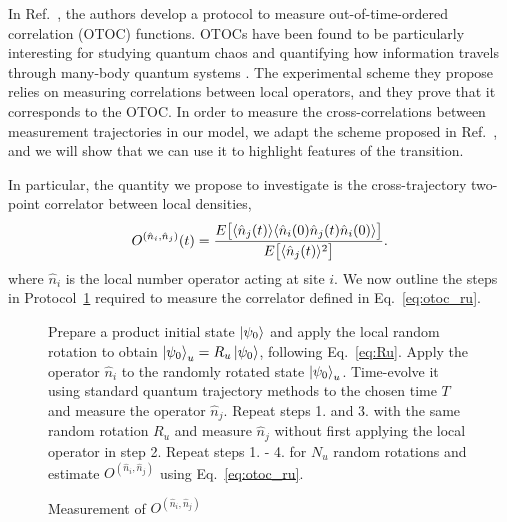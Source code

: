  In Ref.~\cite{vermersch2019}, the authors develop a protocol to measure out-of-time-ordered correlation (OTOC) functions. OTOCs have been found to be particularly interesting for studying quantum chaos \cite{cotler2018} and quantifying how information travels through many-body quantum systems \cite{hosur2016, chen2016,fan2017,nahum2018a, vonkeyserlingk2018a}. The experimental scheme they propose relies on measuring correlations between local operators, and they prove that it corresponds to the OTOC. In order to measure the cross-correlations between measurement trajectories in our model, we adapt the scheme proposed in Ref.~\cite{vermersch2019}, and we will show that we can use it to highlight features of the transition. 
 
 In particular, the quantity we propose to investigate is the cross-trajectory two-point correlator between local densities,
\begin{equation}
\label{eq:otoc_ru}
    O^{(\hat{n}_i,\hat{n}_j)}(t)= \frac{ E\big[\langle\hat{n}_j(t)\rangle \langle\hat{n}_i(0) \hat{n}_j(t) \hat{n}_i(0)\rangle \big] }{ E\big[\langle\hat{n}_j(t)\rangle^2\big]}.
\end{equation}
where $\hat{n}_i$ is the local number operator acting at site $i$. We now outline the steps in Protocol~\ref{alg:protocol1} required to measure the correlator defined in Eq.~\ref{eq:otoc_ru}.

\begin{figure}[ht]
\begin{algorithm}[H]
\caption{Measurement of $O^{(\hat{n}_i,\hat{n}_j)}$}
\label{alg:protocol1}
\renewcommand{\thealgorithm}{}
\begin{algorithmic}[1]
\State Prepare a product initial state $\ket{\psi_0}$ and apply the local random rotation to obtain $\ket{\psi_0}_u = R_u \ket{\psi_0}$, following Eq.~\ref{eq:Ru}. 
\State Apply the operator $\hat{n}_i$ to the randomly rotated state $\ket{\psi_0}_u$. 
\State Time-evolve it using standard quantum trajectory methods to the chosen time $T$ and measure the operator $\hat{n}_j$.
\State Repeat steps 1. and 3. with the same random rotation $R_u$ and measure $\hat{n}_j$ without first applying the local operator in step 2. 
\State Repeat steps 1. - 4. for $N_u$ random rotations and estimate $O^{(\hat{n}_i,\hat{n}_j)}$ using Eq.~\ref{eq:otoc_ru}. 
\end{algorithmic}
\end{algorithm}
\end{figure}


